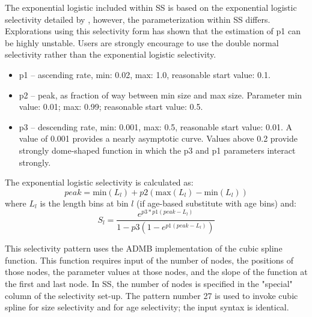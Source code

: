 The exponential logistic included within SS is based on the exponential logistic selectivity detailed by \citet{thompson-confounding-1994}, however, the parameterization within SS differs.  Explorations using this selectivity form has shown that the estimation of p1 can be highly unstable.  Users are strongly encourage to use the double normal selectivity rather than the exponential logistic selectivity.
	\begin{itemize}
		\item p1 – ascending rate, min: 0.02, max: 1.0, reasonable start value: 0.1.
		\item p2 – peak, as fraction of way between min size and max size.  Parameter min value:  0.01; max:  0.99; reasonable start value: 0.5.
		\item p3 – descending rate, min: 0.001, max: 0.5, reasonable start value:  0.01.  A value of 0.001 provides a nearly asymptotic curve. Values above 0.2 provide strongly dome-shaped function in which the p3 and p1 parameters interact strongly.
	\end{itemize}

The exponential logistic selectivity is calculated as:
	\begin{equation}
	peak = \text{min}(L_l) + p2(\text{max}(L_l) - \text{min}(L_l) )
	\end{equation}
where $L_l$ is the length bins at bin $l$ (if age-based substitute with age bins) and:
	\begin{equation}
	S_l = \frac{e^{p3*p1(peak-L_l)}}{1-p3(1-e^{p1(peak- L_l)})}
	\end{equation}


This selectivity pattern uses the ADMB implementation of the cubic spline function. This function requires input of the number of nodes, the positions of those nodes, the parameter values at those nodes, and the slope of the function at the first and last node. In SS, the number of nodes is specified in the "special" column of the selectivity set-up.  The pattern number 27 is used to invoke cubic spline for size selectivity and for age selectivity; the input syntax is identical.
	

